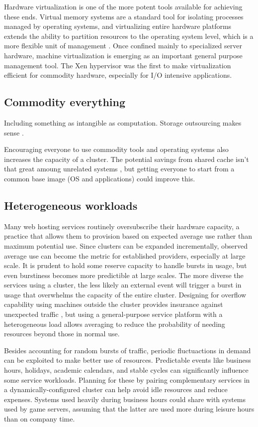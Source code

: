 Hardware virtualization is one of the more potent tools available for achieving these ends. Virtual memory systems are a standard tool for isolating processes managed by operating systems, and virtualizing entire hardware platforms extends the ability to partition resources to the operating system level, which is a more flexible unit of management \cite{hand}. Once confined mainly to specialized server hardware, machine virtualization is emerging as an important general purpose management tool. The Xen hypervisor \cite{barham} was the first to make virtualization efficient for commodity hardware, especially for I/O intensive applications.

\subsection{Commodity everything}

Including something as intangible as computation. Storage outsourcing makes sense \cite{ng}.

Encouraging everyone to use commodity tools and operating systems also increases the capacity of a cluster. The potential savings from shared cache isn't that great amoung unrelated systems \cite{muntz}, but getting everyone to start from a common base image (OS and applications) could improve this.

\subsection{Heterogeneous workloads}

Many web hosting services routinely oversubscribe their hardware capacity, a practice that allows them to provision based on expected average use rather than maximum potential use. Since clusters can be expanded incrementally, observed average use can become the metric for established providers, especially at large scale. It is prudent to hold some reserve capacity to handle bursts in usage, but even burstiness becomes more predictible at large scales. The more diverse the services using a cluster, the less likely an external event will trigger a burst in usage that overwhelms the capacity of the entire cluster. Designing for overflow capability using machines outside the cluster provides insurance against unexpected traffic \cite{fox}, but using a general-purpose service platform with a heterogeneous load allows averaging to reduce the probability of needing resources beyond those in normal use.

Besides accounting for random bursts of traffic, periodic fluctuactions in demand can be exploited to make better use of resources. Predictable events like business hours, holidays, academic calendars, and stable cycles can significantly influence some service workloads. Planning for these by pairing complementary services in a dynamically-configured cluster can help avoid idle resources and reduce expenses. Systems used heavily during business hours could share with systems used by game servers, assuming that the latter are used more during leisure hours than on company time.

